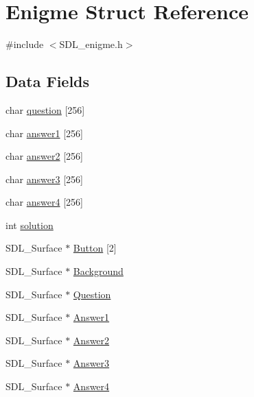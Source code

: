 \hypertarget{structEnigme}{}\section{Enigme Struct Reference}
\label{structEnigme}


{\ttfamily \#include $<$S\+D\+L\+\_\+enigme.\+h$>$}

\subsection*{Data Fields}
\begin{DoxyCompactItemize}
\item 
char \mbox{\hyperlink{structEnigme_a49a3f56c837d97e041cf100e35d230e2}{question}} \mbox{[}256\mbox{]}
\item 
char \mbox{\hyperlink{structEnigme_af8fefd1ff1ab98d6171a4862276b3a97}{answer1}} \mbox{[}256\mbox{]}
\item 
char \mbox{\hyperlink{structEnigme_a3600b0e995b2621888ce1e4fd6e5338d}{answer2}} \mbox{[}256\mbox{]}
\item 
char \mbox{\hyperlink{structEnigme_a99d1e744c3e6f90fc2377e401c43155b}{answer3}} \mbox{[}256\mbox{]}
\item 
char \mbox{\hyperlink{structEnigme_a86480a810392975d845be16d7afe3ee6}{answer4}} \mbox{[}256\mbox{]}
\item 
int \mbox{\hyperlink{structEnigme_a22b07264c0f3795a2d9dc99a5028e075}{solution}}
\item 
S\+D\+L\+\_\+\+Surface $\ast$ \mbox{\hyperlink{structEnigme_ab42d70f221b2b73e1bd1a061132b470d}{Button}} \mbox{[}2\mbox{]}
\item 
S\+D\+L\+\_\+\+Surface $\ast$ \mbox{\hyperlink{structEnigme_a7e712372f47d32a7555e3a423dc851f4}{Background}}
\item 
S\+D\+L\+\_\+\+Surface $\ast$ \mbox{\hyperlink{structEnigme_a82caf85f7598abd1b4c49f61fc8444d6}{Question}}
\item 
S\+D\+L\+\_\+\+Surface $\ast$ \mbox{\hyperlink{structEnigme_a3e80b6f171c8a30ecfb095ede30c9702}{Answer1}}
\item 
S\+D\+L\+\_\+\+Surface $\ast$ \mbox{\hyperlink{structEnigme_aebba33339f08e1dff9c123458b91f1b3}{Answer2}}
\item 
S\+D\+L\+\_\+\+Surface $\ast$ \mbox{\hyperlink{structEnigme_ac2ccc5b4f2e192238280426b6b2e60a5}{Answer3}}
\item 
S\+D\+L\+\_\+\+Surface $\ast$ \mbox{\hyperlink{structEnigme_ab82f03b3ebf160afa884042d9981412a}{Answer4}}

\end{DoxyCompactItemize}
